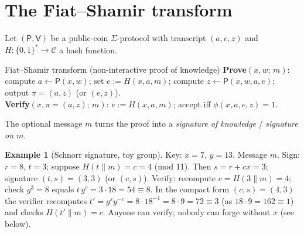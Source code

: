 \documentclass[11pt,a4paper]{report}
\theoremstyle{plain}
\theoremstyle{definition}
\newtheorem{example}[theorem]{Example}
\theoremstyle{remark}
\newcommand{\Prv}{\mathsf{P}}\newcommand{\Ver}{\mathsf{V}}
\begin{document}
\section{The Fiat--Shamir transform}
Let $(\Prv,\Ver)$ be a public-coin $\Sigma$-protocol with transcript $(a,e,z)$ and $H:\{0,1\}^*\to\mathcal C$ a hash function.
\begin{algorithm}[label=pr:fs]{Fiat--Shamir transform (non-interactive proof of knowledge)}
\textbf{Prove}$(x,w;\,m)$: compute $a\leftarrow\Prv(x,w)$; set $e:=H(x,a,m)$; compute $z\leftarrow\Prv(x,w,a,e)$; output $\pi=(a,z)$ (or $(e,z)$).\\
\textbf{Verify}$(x,\pi=(a,z);\,m)$: $e:=H(x,a,m)$; accept iff $\phi(x,a,e,z)=1$.
\end{algorithm}
The optional message $m$ turns the proof into a \emph{signature of knowledge} / \emph{signature on $m$}.
\begin{center}
\end{center}
\begin{example}[Schnorr signature, toy group]\label{ex:schnorrsig}
Key: $x=7$, $y=13$. Message $m$. Sign: $r=8$, $t=3$; suppose $H(t\|m)=c=4$ (mod 11). Then $s=r+cx=3$; signature $(t,s)=(3,3)$ (or $(c,s)$). Verify: recompute $c=H(3\|m)=4$; check $g^3=8$ equals $t\,y^c=3\cdot18=54\equiv8$. \checkmark In the compact form $(c,s)=(4,3)$ the verifier recomputes $t'=g^sy^{-c}=8\cdot18^{-1}=8\cdot9=72\equiv3$ (as $18\cdot9=162\equiv1$) and checks $H(t'\|m)=c$. Anyone can verify; nobody can forge without $x$ (see below).
\end{example}
\end{document}
